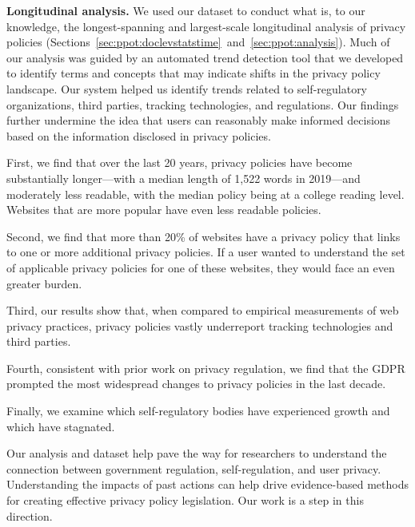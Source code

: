 \textbf{Longitudinal analysis.} We used our dataset to conduct what is, to our knowledge, the longest-spanning and largest-scale longitudinal analysis of privacy policies (Sections~\ref{sec:ppot:doclevstatstime}~and~\ref{sec:ppot:analysis}).
Much of our analysis was guided by an automated trend detection tool that we developed to identify terms and concepts that may indicate shifts in the privacy policy landscape. Our system helped us identify trends related to self-regulatory organizations, third parties, tracking technologies, and regulations.
Our findings further undermine the idea that users can reasonably make informed decisions based on the information disclosed in privacy policies.

First, we find that over the last 20 years, privacy policies have become substantially longer---with a median length of 1,522 words in 2019---and moderately less readable, with the median policy being at a college reading level. Websites that are more popular have even less readable policies.

Second, we find that more than 20\% of websites have a privacy policy that links to one or more additional privacy policies. If a user wanted to understand the set of applicable privacy policies for one of these websites, they would face an even greater burden.


Third, our results show that, when compared to empirical measurements of web privacy practices, privacy policies vastly underreport tracking technologies and third parties.

Fourth, consistent with prior work on privacy regulation, we find that the GDPR prompted the most widespread changes to privacy policies in the last decade.

Finally, we examine which self-regulatory bodies have experienced growth and which have stagnated.

Our analysis and dataset help pave the way for researchers to understand the connection between government regulation, self-regulation, and user privacy. Understanding the impacts of past actions can help drive evidence-based methods for creating effective privacy policy legislation. Our work is a step in this direction.


